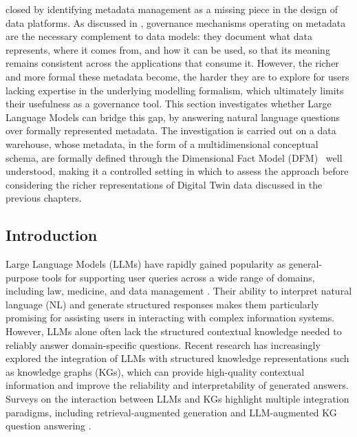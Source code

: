 {\color{red}
 closed by identifying metadata management as a missing piece in the design of data platforms. As discussed in , governance mechanisms operating on metadata are the necessary complement to data models: they document what data represents, where it comes from, and how it can be used, so that its meaning remains consistent across the applications that consume it. However, the richer and more formal these metadata become, the harder they are to explore for users lacking expertise in the underlying modelling formalism, which ultimately limits their usefulness as a governance tool. This section investigates whether Large Language Models can bridge this gap, by answering natural language questions over formally represented metadata. The investigation is carried out on a data warehouse, whose metadata, in the form of a multidimensional conceptual schema, are formally defined through the Dimensional Fact Model (DFM)~\cite{golfarelli2009data} well understood, making it a controlled setting in which to assess the approach before considering the richer representations of Digital Twin data discussed in the previous chapters.
}

\subsection{Introduction}
\label{sec:llm-intro}

Large Language Models (LLMs) have rapidly gained popularity as general-purpose tools for supporting user queries across a wide range of domains, including law, medicine, and data management \cite{DBLP:journals/pvldb/LiZZ24,gao2025leveraging,thenmozhi2025hierarchical}. Their ability to interpret natural language (NL) and generate structured responses makes them particularly promising for assisting users in interacting with complex information systems. However, LLMs alone often lack the structured contextual knowledge needed to reliably answer domain-specific questions. Recent research has increasingly explored the integration of LLMs with structured knowledge representations such as knowledge graphs (KGs), which can provide high-quality contextual information and improve the reliability and interpretability of generated answers. Surveys on the interaction between LLMs and KGs highlight multiple integration paradigms, including retrieval-augmented generation and LLM-augmented KG question answering \cite{DBLP:journals/tkde/PanLWCWW24,DBLP:journals/tgdk/PanRKSCDJO0LBMB23,DBLP:journals/tkde/JinLHJJH24}.

